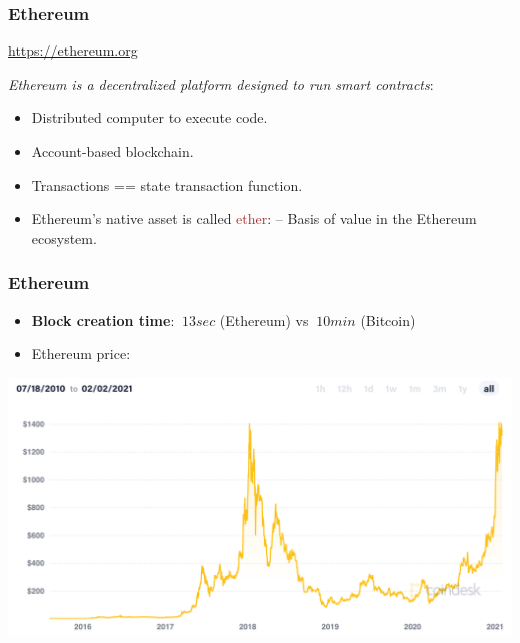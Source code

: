 \documentclass{beamer}
\begin{document}
\begin{frame}
  \frametitle{Ethereum}
	\url{https://ethereum.org}
	\pause
	\begin{block}{\emph{Ethereum is a decentralized platform designed to run smart contracts}:}
	\begin{itemize}
		\item Distributed computer to execute code. \pause
		\item Account-based blockchain. \pause
		\item Transactions == state transaction function. \pause
		\item Ethereum's  native asset is called \textcolor{brown}{ether}: 
			-- Basis of value in the Ethereum ecosystem.
	\end{itemize}
	\end{block}
\end{frame}
\begin{frame}
  \frametitle{Ethereum}
  	\begin{itemize}
  		\item \textbf{Block creation time}: $~13 sec$ (Ethereum) vs $~10 min$ (Bitcoin)
  		\item Ethereum price:
  	\end{itemize}
 	\centering
	\includegraphics[scale=0.32]{etherium}
\end{frame}
\end{document}
